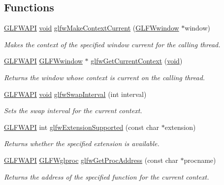 \subsection*{Functions}
\begin{DoxyCompactItemize}
\item 
\mbox{\hyperlink{glfw3_8h_a56da5036b2cc259351ae22fd6439bb47}{G\+L\+F\+W\+A\+PI}} \mbox{\hyperlink{glad_8h_a950fc91edb4504f62f1c577bf4727c29}{void}} \mbox{\hyperlink{group__context_gafd76c93e15ec8b0b90506a9936a46185}{glfw\+Make\+Context\+Current}} (\mbox{\hyperlink{group__window_ga3c96d80d363e67d13a41b5d1821f3242}{G\+L\+F\+Wwindow}} $\ast$window)
\begin{DoxyCompactList}\small\item\em Makes the context of the specified window current for the calling thread. \end{DoxyCompactList}\item 
\mbox{\hyperlink{glfw3_8h_a56da5036b2cc259351ae22fd6439bb47}{G\+L\+F\+W\+A\+PI}} \mbox{\hyperlink{group__window_ga3c96d80d363e67d13a41b5d1821f3242}{G\+L\+F\+Wwindow}} $\ast$ \mbox{\hyperlink{group__context_gac28d98c655377d81a516bf5ef90780c8}{glfw\+Get\+Current\+Context}} (\mbox{\hyperlink{glad_8h_a950fc91edb4504f62f1c577bf4727c29}{void}})
\begin{DoxyCompactList}\small\item\em Returns the window whose context is current on the calling thread. \end{DoxyCompactList}\item 
\mbox{\hyperlink{glfw3_8h_a56da5036b2cc259351ae22fd6439bb47}{G\+L\+F\+W\+A\+PI}} \mbox{\hyperlink{glad_8h_a950fc91edb4504f62f1c577bf4727c29}{void}} \mbox{\hyperlink{group__context_ga12a595c06947cec4967c6e1f14210a8a}{glfw\+Swap\+Interval}} (int interval)
\begin{DoxyCompactList}\small\item\em Sets the swap interval for the current context. \end{DoxyCompactList}\item 
\mbox{\hyperlink{glfw3_8h_a56da5036b2cc259351ae22fd6439bb47}{G\+L\+F\+W\+A\+PI}} int \mbox{\hyperlink{group__context_ga9a28c712d35f9e43534e1d03b051c04c}{glfw\+Extension\+Supported}} (const char $\ast$extension)
\begin{DoxyCompactList}\small\item\em Returns whether the specified extension is available. \end{DoxyCompactList}\item 
\mbox{\hyperlink{glfw3_8h_a56da5036b2cc259351ae22fd6439bb47}{G\+L\+F\+W\+A\+PI}} \mbox{\hyperlink{group__context_ga3d47c2d2fbe0be9c505d0e04e91a133c}{G\+L\+F\+Wglproc}} \mbox{\hyperlink{group__context_ga0e8af175218929615c16e74938c10f2a}{glfw\+Get\+Proc\+Address}} (const char $\ast$procname)
\begin{DoxyCompactList}\small\item\em Returns the address of the specified function for the current context. \end{DoxyCompactList}\end{DoxyCompactItemize}


